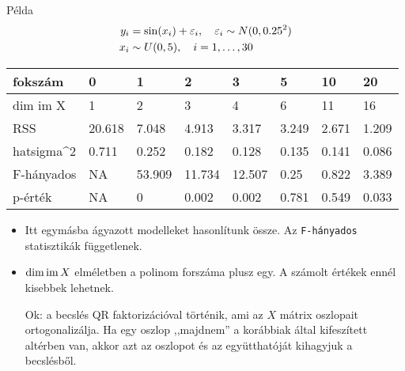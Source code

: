 \documentclass[aspectratio=169,notheorems,9pt,\option]{beamer}\usepackage[]{graphicx}\usepackage[]{color}
\newenvironment{knitrout}{}{} %
\begin{document}
\begin{frame}{Példa}
  \begin{align*}
    y_i&=\sin(x_i)+\varepsilon_i,
    \quad \varepsilon_i\sim N(0,0.25^2)\\
    x_i&\sim U(0,5),
    \quad i=1,\dots,30
  \end{align*}



\begin{knitrout}
\color{fgcolor}
\begin{tabular}{l|l|l|l|l|l|l|l}
\hline
fokszám & 0 & 1 & 2 & 3 & 5 & 10 & 20\\
\hline
dim im X & 1 & 2 & 3 & 4 & 6 & 11 & 16\\
\hline
RSS & 20.618 & 7.048 & 4.913 & 3.317 & 3.249 & 2.671 & 1.209\\
\hline
hatsigma\textasciicircum{}2 & 0.711 & 0.252 & 0.182 & 0.128 & 0.135 & 0.141 & 0.086\\
\hline
F-hányados & NA & 53.909 & 11.734 & 12.507 & 0.25 & 0.822 & 3.389\\
\hline
p-érték & NA & 0 & 0.002 & 0.002 & 0.781 & 0.549 & 0.033\\
\hline
\end{tabular}

\end{knitrout}

  \bigskip

  \begin{itemize}
    \item Itt egymásba ágyazott modelleket hasonlítunk össze. 
    Az \texttt{F-hányados} statisztikák függetlenek.
    
    \item $\dim\operatorname{im} X$ elméletben a polinom forszáma plusz egy. A számolt 
    értékek ennél kisebbek lehetnek. 
    
    Ok: a becslés QR faktorizációval történik, ami az 
    $X$ mátrix oszlopait ortogonalizálja. Ha egy oszlop ,,majdnem'' 
    a korábbiak által kifeszített altérben van, akkor azt az oszlopot 
    és az együtthatóját kihagyjuk a becslésből.
    
  \end{itemize}
\end{frame}
\end{document}
